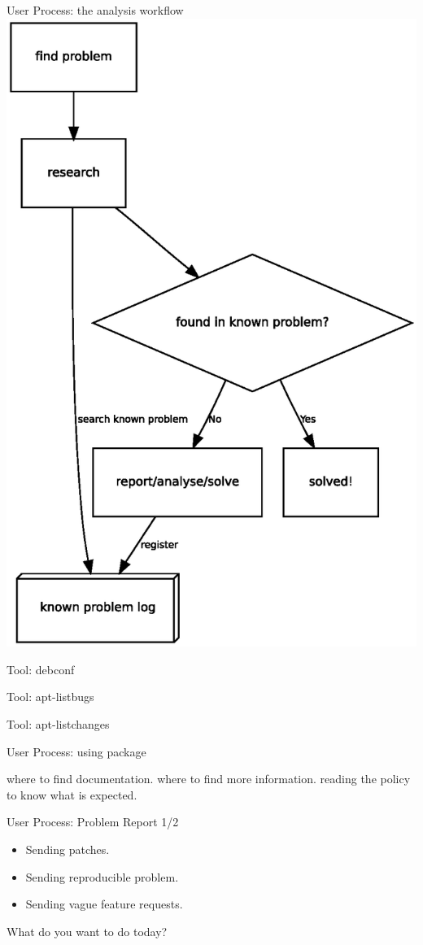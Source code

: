 \documentclass[cjk,dvipdfm,12pt]{beamer}
\begin{document}
\begin{frame}{User Process: the analysis workflow}
 \includegraphics[width=0.5\hsize]{image200805/problemcycle-en.eps}
\end{frame}

\begin{frame}{Tool: debconf}
\end{frame}

\begin{frame}{Tool: apt-listbugs}
\end{frame}

\begin{frame}{Tool: apt-listchanges}
\end{frame}

\begin{frame}{User Process: using package}

where to find documentation.
where to find more information.
reading the policy to know what is expected.

\end{frame}

\begin{frame}{User Process: Problem Report 1/2}
\begin{itemize}
 \item Sending patches.
 \item Sending reproducible problem.
 \item Sending vague feature requests.
\end{itemize}

What do you want to do today?
\end{frame}
\end{document}
